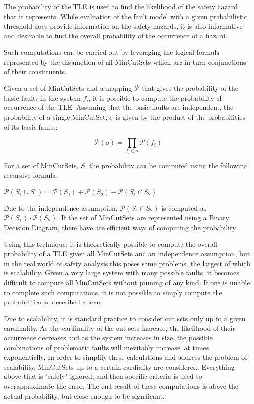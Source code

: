 The probability of the TLE is used to find the likelihood of the safety hazard that it represents. While evaluation of the fault model with a given probabilistic threshold does provide information on the safety hazards, it is also informative and desirable to find the overall probability of the occurrence of a hazard. 

Such computations can be carried out by leveraging the logical formula represented by the disjunction of all MinCutSets which are in turn conjunctions of their constituents. 

Given a set of MinCutSets and a mapping $\mathcal{P}$ that gives the probability of the basic faults in the system $f_i$, it is possible to compute the probability of occurrence of the TLE. Assuming that the basic faults are independent, the probability of a single MinCutSet, $\sigma$ is given by the product of the probabilities of its basic faults:
\begin{center}
    \begin{equation*}\mathcal{P}(\sigma) = \prod_{f_i \in \sigma} \mathcal{P}(f_i) 
    \end{equation*}    
\end{center}

For a set of MinCutSets, $S$, the probability can be computed using the following recursive formula:

\begin{center}
    $\mathcal{P}(S_1 \cup S_2) = \mathcal{P}(S_1) + \mathcal{P}(S_2) - \mathcal{P}(S_1 \cap S_2)$
\end{center}

Due to the independence assumption, $\mathcal{P}(S_1 \cap S_2)$ is computed as $\mathcal{P}(S_1) \cdot   \mathcal{P}(S_2)$. If the set of MinCutSets are represented using a Binary Decision Diagram, there have are efficient ways of computing the probability . 

Using this technique, it is theoretically possible to compute the overall probability of a TLE given all MinCutSets and an independence assumption, but in the real world of safety analysis this poses some problems, the largest of which is scalability. Given a very large system with many possible faults, it becomes difficult to compute all MinCutSets without pruning of any kind. If one is unable to complete such computations, it is not possible to simply compute the probabilities as described above. 

Due to scalability, it is standard practice to consider cut sets only up to a given cardinality. As the cardinality of the cut sets increase, the likelihood of their occurrence decreases and as the system increases in size, the possible combinations of problematic faults will inevitably increase, at times exponentially. In order to simplify these calculations and address the problem of scalability, MinCutSets up to a certain cardiality are considered. Everything above that is "safely" ignored, and then specific criteria is used to overapproximate the error. The end result of these computations is above the actual probability, but close enough to be significant. 


